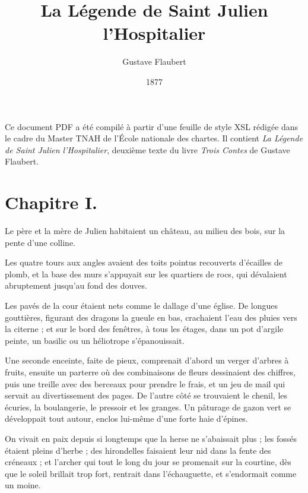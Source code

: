 \documentclass[]{book}
\title{\textbf{La Légende de Saint Julien l'Hospitalier}}
\author{Gustave Flaubert}
\date{1877}
\begin{document}
            \maketitle
            
            \vspace*{3cm}
            \begin{Large}
            Ce document PDF a été compilé à partir d'une feuille de style XSL rédigée dans le cadre du Master TNAH de l'École nationale des chartes. Il contient \textit{La Légende de Saint Julien l'Hospitalier}, deuxième texte du livre \textit{Trois Contes} de Gustave Flaubert.
            \end{Large}
                
            \newpage
                
            
            \chapter{Chapitre I.}
            
            Le père et la mère de Julien habitaient un château, au milieu des bois, sur la pente d'une colline.
                    
                Les quatre tours aux angles avaient des toits pointus recouverts d'écailles de plomb, et la base des murs s'appuyait sur les quartiers de rocs, qui dévalaient abruptement jusqu'au fond des douves.
                    
                Les pavés de la cour étaient nets comme le dallage d'une église. De longues gouttières, figurant des dragons la gueule en bas, crachaient l'eau des pluies vers la citerne ; et sur le bord des fenêtres, à tous les étages, dans un pot d'argile peinte, un basilic ou un héliotrope s'épanouissait.
                    
                Une seconde enceinte, faite de pieux, comprenait d'abord un verger d'arbres à fruits, ensuite un parterre où des combinaisons de fleurs dessinaient des chiffres, puis une treille avec des berceaux pour prendre le frais, et un jeu de mail qui servait au divertissement des pages. De l'autre côté se trouvaient le chenil, les écuries, la boulangerie, le pressoir et les granges. Un pâturage de gazon vert se développait tout autour, enclos lui-même d'une forte haie d'épines.
                    
                On vivait en paix depuis si longtemps que la herse ne s'abaissait plus ; les fossés étaient pleins d'herbe ; des hirondelles faisaient leur nid dans la fente des créneaux ; et l'archer qui tout le long du jour se promenait sur la courtine, dès que le soleil brillait trop fort, rentrait dans l'échauguette, et s'endormait comme un moine.
                    
\end{document}
